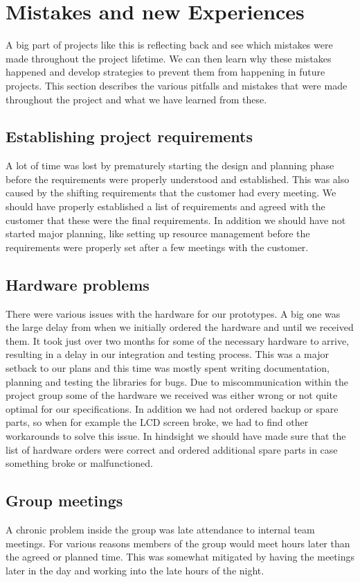 \section{Mistakes and new Experiences}
A big part of projects like this is reflecting back and see which mistakes were made throughout
the project lifetime. We can then learn why these mistakes happened and develop strategies to
prevent them from happening in future projects. This section describes the various pitfalls and
mistakes that were made throughout the project and what we have learned from these.

\subsection{Establishing project requirements}
A lot of time was lost by prematurely starting the design and planning phase before the
requirements were properly understood and established. This was also caused by the shifting 
requirements that the customer had every meeting. We should have properly established a list of
requirements and agreed with the customer that these were the final requirements. In addition we
should have not started major planning, like setting up resource management before the requirements
were properly set after a few meetings with the customer.

\subsection{Hardware problems}
There were various issues with the hardware for our prototypes. A big one was the large delay
from when we initially ordered the hardware and until we received them. It took just over two months for
some of the necessary hardware to arrive, resulting in a delay in our integration and testing process.
This was a major setback to our plans and this time was mostly spent writing documentation, planning
and testing the libraries for bugs. Due to miscommunication within the project group some of the 
hardware we received was either wrong or not quite optimal for our specifications. In addition we had 
not ordered backup or spare parts, so when for example the LCD screen broke, we had to find other 
workarounds to solve this issue. In hindsight we should have made sure that the list of hardware orders 
were correct and ordered additional spare parts in case something broke or malfunctioned.

\subsection{Group meetings}
A chronic problem inside the group was late attendance to internal team meetings. For various reasons members of
the group would meet hours later than the agreed or planned time. This was somewhat mitigated by having 
the meetings later in the day and working into the late hours of the night.


